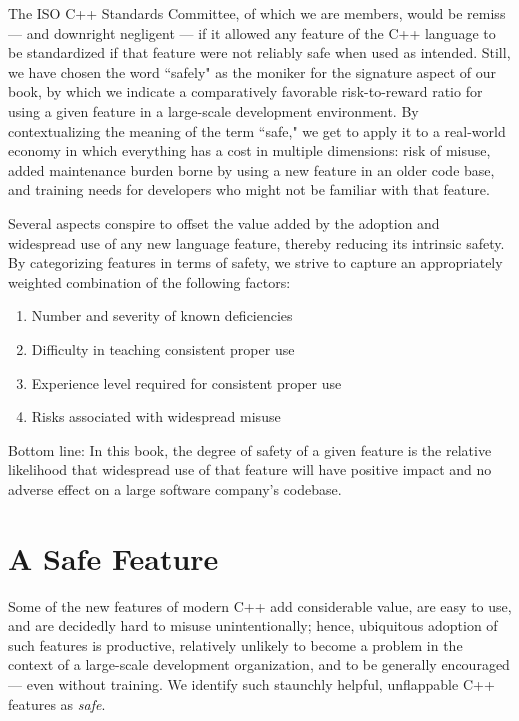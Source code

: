 The ISO C++ Standards Committee, of which we are members, would be remiss --- and downright negligent --- if it allowed any feature of the C++ language to be standardized if that feature were not reliably safe when used as intended. Still, we have chosen the word ``safely" as the moniker for the signature aspect of our book, by which we indicate a comparatively favorable risk-to-reward ratio for using a given feature in a large-scale development environment. By contextualizing the meaning of the term ``safe," we get to apply it to a real-world economy in which everything has a cost in multiple dimensions: risk of misuse, added maintenance burden borne by using a new feature in an older code base, and training needs for developers who might not be familiar with that feature.

Several aspects conspire to offset the value added by the adoption and widespread use of any new language feature, thereby reducing its intrinsic safety. By categorizing features in terms of safety, we strive to capture an appropriately weighted combination of the following factors:
\begin{enumerate}
\item{Number and severity of known deficiencies}
\item{Difficulty in teaching consistent proper use}
\item{Experience level required for consistent proper use}
\item{Risks associated with widespread misuse}
\end{enumerate}
Bottom line: In this book, the degree of safety of a given feature is the relative likelihood that widespread use of that feature will have positive impact and no adverse effect on a large software company’s codebase.

\section[A {\sffamily\itshape Safe} Feature]{A {\sfbsectionitalRomeo Safe} Feature}

Some of the new features of modern C++ add considerable value, are easy to use, and are decidedly hard to misuse unintentionally; hence, ubiquitous adoption of such features is productive, relatively unlikely to become a problem in the context of a large-scale development organization, and to be generally encouraged --- even without training. We identify such staunchly helpful, unflappable C++ features as \textit{safe}.

